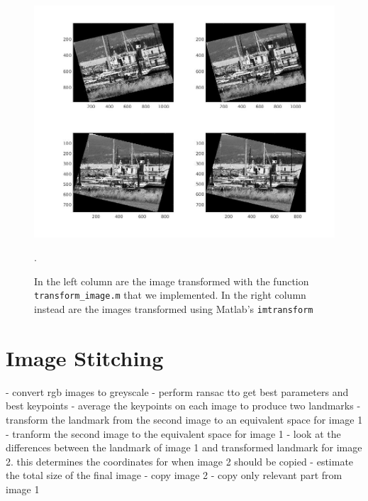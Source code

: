 \documentclass[11pt]{article}
\begin{document}
\begin{figure}[htpb]
	\centering
	\includegraphics[width=1\textwidth]{imgs/imtransform_vs_custom.jpg}
	\caption{In the left column are the image transformed with the function
		\texttt{transform\_image.m} that we implemented. In the right
		column instead are the images transformed using Matlab's
		\texttt{imtransform}}.
	\label{fig:imtransform_vs_custom}
\end{figure}



\section{Image Stitching}
- convert rgb images to greyscale
- perform ransac tto get best parameters and best keypoints
- average the keypoints on each image to produce two landmarks
- transform the landmark from the second image to an equivalent space for image 1
- tranform the second image to the equivalent space for image 1
- look at the differences between the landmark of image 1 and transformed landmark for image 2. this determines the coordinates for when image 2 should be copied
-  estimate the total size of the final image
- copy image 2
- copy only relevant part from image 1  
\end{document}
